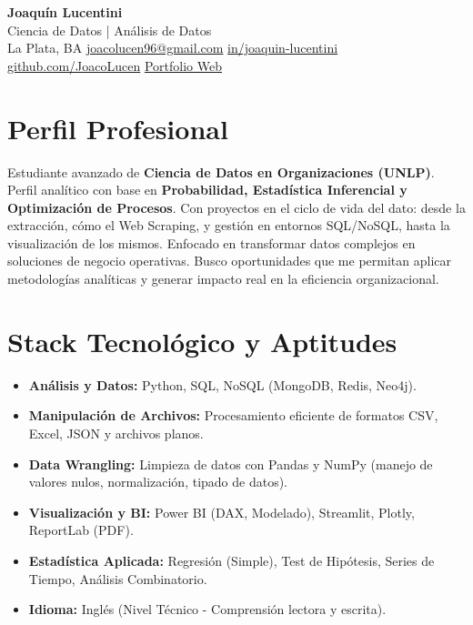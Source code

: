 \documentclass[11pt, a4paper]{article}
\begin{document}
\begin{center}
    {\Huge \textbf{Joaquín Lucentini}}\\[5pt]
    {\Large \color{secondary} Ciencia de Datos | Análisis de Datos}\\[8pt]
    
    {\small
        \faMapMarker{} La Plata, BA \quad \textbullet \quad
        \faEnvelope{} \href{mailto:joacolucen96@gmail.com}{joacolucen96@gmail.com} \quad \textbullet \quad
        \faLinkedin{} \href{https://www.linkedin.com/in/joaquin-lucentini-a48066277/}{in/joaquin-lucentini}
        \\[3pt]
        \faGithub{} \href{https://github.com/JoacoLucen}{github.com/JoacoLucen} \quad \textbullet \quad
        \faGlobe{} \href{https://joacolucen.github.io/Joaquin-Lucentini-Portfolio.github.io/}{Portfolio Web}
    }
\end{center}

\section*{Perfil Profesional}
Estudiante avanzado de \textbf{Ciencia de Datos en Organizaciones (UNLP)}. Perfil analítico con base en \textbf{Probabilidad, Estadística Inferencial y Optimización de Procesos}. Con proyectos en el ciclo de vida del dato: desde la extracción, cómo el Web Scraping, y gestión en entornos SQL/NoSQL, hasta la visualización de los mismos. Enfocado en transformar datos complejos en soluciones de negocio operativas. Busco oportunidades que me permitan aplicar metodologías analíticas y generar impacto real en la eficiencia organizacional.

\section*{Stack Tecnológico y Aptitudes}
\begin{itemize}[leftmargin=*, noitemsep]
    \item \textbf{Análisis y Datos:} Python, SQL, NoSQL (MongoDB, Redis, Neo4j).
    \item \textbf{Manipulación de Archivos:} Procesamiento eficiente de formatos CSV, Excel, JSON y archivos planos.
    \item \textbf{Data Wrangling:} Limpieza de datos con Pandas y NumPy (manejo de valores nulos, normalización, tipado de datos).
    \item \textbf{Visualización y BI:} Power BI (DAX, Modelado), Streamlit, Plotly, ReportLab (PDF).
    \item \textbf{Estadística Aplicada:} Regresión (Simple), Test de Hipótesis, Series de Tiempo, Análisis Combinatorio.
    \item \textbf{Idioma:} Inglés (Nivel Técnico - Comprensión lectora y escrita).
\end{itemize}
\end{document}
